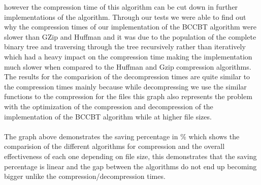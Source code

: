 \documentclass[12pt]{IEEEtran}
\begin{document}
however the compression time of this algorithm can be cut down in further implementations of 
the algorithm.  Through our tests we were able to find out why the compression times of our
implementation of the BCCBT algorithm were slower than GZip and Huffman and it was due to the
population of the complete binary tree and traversing through the tree recursively rather than
iteratively which had a heavy impact on the compression time making the implementation much
slower when compared to the Huffman and Gzip compression algorithms.
\\
The results for the comparision of the decompression times are quite similar to the 
compression times mainly because while decompressing we use the similar functions to the 
compression for the files this graph also represents the problem with the optimization of
the compression and decompression of the implementation of the BCCBT algorithm while at higher
file sizes.\\
\\
The graph above demonstrates the saving percentage in \% which shows the 
comparision of the different algorithms for compression and the overall
effectiveness of each one depending on file size, this demonstrates that
the saving percentage is linear and the gap between the algorithms do not
end up becoming bigger unlike the compression/decompression times.
\end{document}
